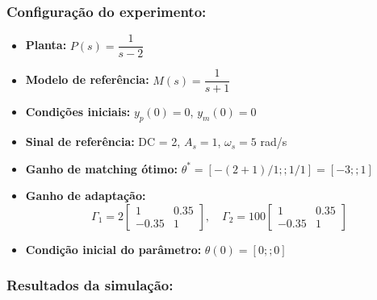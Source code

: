 \documentclass[10pt]{article}
\begin{document}
\subsubsection{Configuração do experimento:}
\begin{itemize}
\item \textbf{Planta:} $P(s) = \dfrac{1}{s - 2}$
\item \textbf{Modelo de referência:} $M(s) = \dfrac{1}{s + 1}$
\item \textbf{Condições iniciais:} $y_p(0)=0$, $y_m(0)=0$
\item \textbf{Sinal de referência:} DC = 2, $A_s=1$, $\omega_s=5$ rad/s
\item \textbf{Ganho de matching ótimo:} $\theta^* = [-(2+1)/1;;1/1] = [-3;;1]$
\item \textbf{Ganho de adaptação:} 
\[
\Gamma_1 = 2 \begin{bmatrix} 1 & 0.35 \\ -0.35 & 1 \end{bmatrix}, \quad
\Gamma_2 = 100 \begin{bmatrix} 1 & 0.35 \\ -0.35 & 1 \end{bmatrix}
\]
\item \textbf{Condição inicial do parâmetro:} $\theta(0) = [0;;0]$
\end{itemize}

\subsubsection{Resultados da simulação:}
\end{document}
